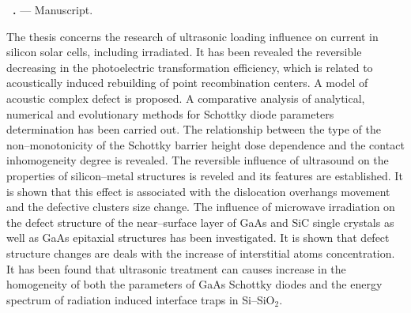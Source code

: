 \textbf{\thesisAuthorFIOen~\thesisTitleEn.} ---  Manuscript.

\abstractBeginEn

The thesis concerns the research of ultrasonic loading influence on current in silicon solar cells,
 including irradiated.
 It has been revealed the reversible decreasing in the photoelectric transformation efficiency,
 which is related to acoustically induced rebuilding of point recombination centers.
 A model of acoustic complex defect is proposed.
 A comparative analysis of analytical, numerical and evolutionary methods for Schottky diode parameters determination  has been carried out.
 The relationship between the type of the non--monotonicity of the Schottky barrier height dose dependence and the contact inhomogeneity degree is revealed.
 The reversible influence of ultrasound on the properties of silicon--metal structures is reveled and its features are established.
It is shown that this effect is associated with the dislocation overhangs movement and the defective clusters size change.
 The influence of microwave irradiation on the defect structure of the near--surface layer of  GaAs and SiC single crystals as well as GaAs epitaxial structures has been investigated.
 It is shown that defect structure changes are deals with the increase of interstitial atoms concentration.
 It has been found that ultrasonic treatment can causes increase in the homogeneity of both the parameters of GaAs Schottky diodes and the energy spectrum of radiation induced interface traps in Si--SiO$_2$.

\keywordsEn
